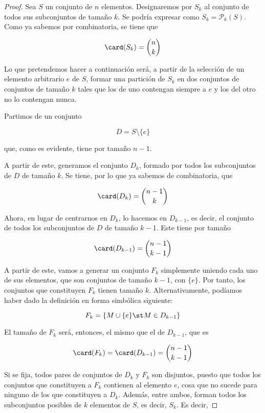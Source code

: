 \begin{proof}
  Sea $S$ un conjunto de $n$ elementos. Designaremos por $S_k$ al conjunto
  de todos sus subconjuntos de tamaño $k$. Se podría expresar como $S_k =
  \mathcal{P}_k(S)$. Como ya sabemos por combinatoria, se tiene que

  $$ \card(S_k) = {n \choose k} $$

  Lo que pretendemos hacer a continuación será, a partir de la selección de
  un elemento arbitrario $e$ de $S$, formar una partición de $S_k$ en dos
  conjuntos de conjuntos de tamaño $k$ tales que los de uno contengan
  siempre a $e$ y los del otro no lo contengan nunca.

  Partimos de un conjunto

  $$ D = S \setminus \{e\} $$

  \noindent que, como es evidente, tiene por tamaño $n-1$.

  A partir de este, generamos el conjunto $D_k$, formado por todos los
  subconjuntos de $D$ de tamaño $k$. Se tiene, por lo que ya sabemos de
  combinatoria, que

  $$ \card(D_k) = {n-1 \choose k} $$

  \iffalse
  Advierta también que $D_k$ consta de todos los subconjuntos de $S$ de
  tamaño $k$ que no contienen a $e$.
  \fi

  Ahora, en lugar de centrarnos en $D_k$, lo hacemos en $D_{k-1}$, es decir,
  el conjunto de todos los subconjuntos de $D$ de tamaño $k-1$. Este tiene
  por tamaño

  $$ \card(D_{k-1}) = {n-1 \choose k-1} $$

  A partir de este, vamos a generar un conjunto $F_k$ simplemente uniendo
  cada uno de sus elementos, que son conjuntos de tamaño $k-1$, con $\{e\}$.
  Por tanto, los conjuntos que constituyen $F_k$ tienen tamaño $k$.
  Alternativamente, podíamos haber dado la definición en forma simbólica
  siguiente:

  $$ F_k = \left\{M \cup \{e\} \st M \in D_{k-1}\right\} $$

  \noindent El tamaño de $F_k$ será, entonces, el mismo que el de $D_{k-1}$,
  que es

  $$ \card(F_k) = \card(D_{k-1}) = {n-1 \choose k-1} $$

  \iffalse
  Advierta que $F_k$ sería también el conjunto de todos los subconjuntos de
  $S$ de tamaño $k$ que contienen a $e$.
  \fi

  Si se fija, todos pares de conjuntos de $D_k$ y $F_k$ son disjuntos,
  puesto que todos los conjuntos que constituyen a $F_k$ contienen al
  elemento $e$, cosa que no sucede para ninguno de los que constituyen a
  $D_k$. Además, entre ambos, forman todos los subconjuntos posibles de $k$
  elementos de $S$, es decir, $S_k$. Es decir,


\end{proof}
